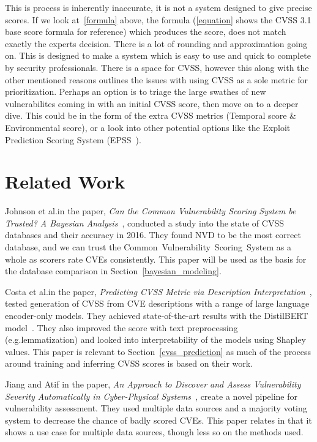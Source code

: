 \documentclass[12pt]{article}
\begin{document}
This is process is inherently inaccurate, it is not a system designed to give precise scores. If we
look at~\ref{formula} above, the formula (\ref{equation} shows the CVSS 3.1 base score formula for
reference) which produces the score, does not match exactly the experts decision. There is a lot of
rounding and approximation going on. This is designed to make a system which is easy to use and
quick to complete by security professionals. There is a space for CVSS, however this along with the
other mentioned reasons outlines the issues with using CVSS as a sole metric for prioritization. Perhaps an option
is to triage the large swathes of new vulnerabilites coming in with an initial CVSS score, then move
on to a deeper dive. This could be in the form of the extra CVSS metrics (Temporal score \&
Environmental score), or a look into other potential options like the Exploit Prediction Scoring
System (EPSS~\cite{EPSS}).
\section{Related Work}


Johnson et al.\@ in the paper,
\textit{Can the Common Vulnerability Scoring System be Trusted? A Bayesian
	Analysis}~\cite{bayes}, conducted a study into the state of CVSS databases and their accuracy in 2016.
They found NVD to be the most correct database, and we can trust the Common~Vulnerability~Scoring~System as a
whole as scorers rate CVEs consistently. This paper will be used as the basis for the database
comparison in Section~\ref{bayesian_modeling}.

Costa et al.\@ in the paper, \textit{Predicting CVSS Metric via Description
	Interpretation}~\cite{costa}, tested generation of CVSS from CVE descriptions with a range of large
language encoder-only models. They achieved state-of-the-art results with the DistilBERT
model~\cite{distilbert}. They also improved the score with text preprocessing (e.g.\@ lemmatization)
and looked into interpretability of the models using Shapley values. This paper is relevant to
Section~\ref{cvss_prediction} as much of the process around training and inferring CVSS scores is
based on their work.

Jiang and Atif in the paper, \textit{An Approach to Discover and Assess
	Vulnerability Severity Automatically in Cyber-Physical Systems}~\cite{jiang}, create a novel
pipeline for vulnerability assessment. They used multiple data sources and a majority voting system
to decrease the chance of badly scored CVEs. This paper relates in that it shows a use case for
multiple data sources, though less so on the methods used.
\end{document}

